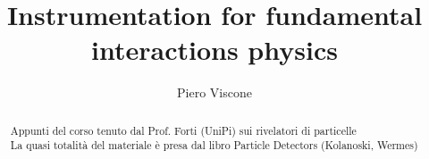 \documentclass[a4paper]{report}
\author{Piero Viscone}
\title{Instrumentation for fundamental interactions physics}
\date{}
\begin{document}
\maketitle

\begin{abstract}
	Appunti del corso tenuto dal Prof. Forti (UniPi) sui rivelatori di particelle\\ 
	La quasi totalità del materiale è presa dal libro Particle Detectors (Kolanoski, Wermes) \cite{Kolanoski:2020ksk}
\end{abstract}

\newpage

\tableofcontents
{}
\newpage
\iffalse

\fi




\appendix
\appendixpage
\iffalse

\fi


\newpage
\printbibliography
\end{document}

